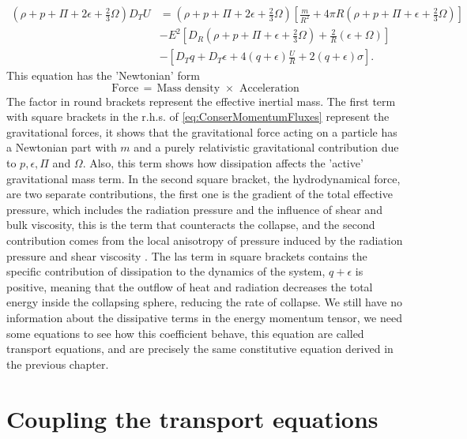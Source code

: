 \begin{align}
	\label{eq:ConserMomentumFluxes}
	\left(\rho + p + \Pi + 2\epsilon + \frac{2}{3}\Omega\right)D_T U &= \left(\rho + p + \Pi + 2\epsilon + \frac{2}{3}\Omega\right)\left[\frac{m}{R^2} + 4\pi R\left(\rho + p + \Pi + \epsilon + \frac{2}{3}\Omega\right) \right] \\\nonumber
	&-E^2 \left[D_R\left(\rho + p + \Pi + \epsilon + \frac{2}{3}\Omega\right) + \frac{2}{R}(\epsilon + \Omega)\right]\\\nonumber &- \left[D_T q + D_T \epsilon + 4(q+\epsilon)\frac{U}{R} + 2(q+\epsilon)\sigma \right].
\end{align}
This equation has the 'Newtonian' form 
$$
\text{Force}\, = \,\text{Mass density}\,\, \times \,\,\text{Acceleration}
$$
The factor in round brackets represent the effective inertial mass. The first term with square brackets in the r.h.s. of \ref{eq:ConserMomentumFluxes} represent the gravitational forces, it shows that  the gravitational force acting on a particle has a Newtonian part with $m$ and a purely relativistic gravitational contribution due to $p, \epsilon, \Pi$ and $\Omega$. Also, this term shows how dissipation affects the 'active' gravitational mass term. In the second square bracket, the hydrodynamical force, are two separate contributions, the first one is the gradient of the total effective pressure, which includes the radiation pressure and the influence of shear and bulk viscosity, this is the term that counteracts the collapse, and the second contribution comes from the local anisotropy of pressure induced by the radiation pressure and shear viscosity\cite{herrera2009dynamics} \cite{herrera2004dynamics}. The las term in square brackets contains the specific contribution of dissipation to the dynamics of the system, $q + \epsilon$ is positive, meaning that the outflow of heat and radiation decreases the total energy inside the collapsing sphere, reducing the rate of collapse. We still have no information about the dissipative terms in the energy momentum tensor, we need some equations to see how this coefficient behave, this equation are called transport equations, and are precisely the same constitutive equation derived in the previous chapter.

\section{Coupling the transport equations}


